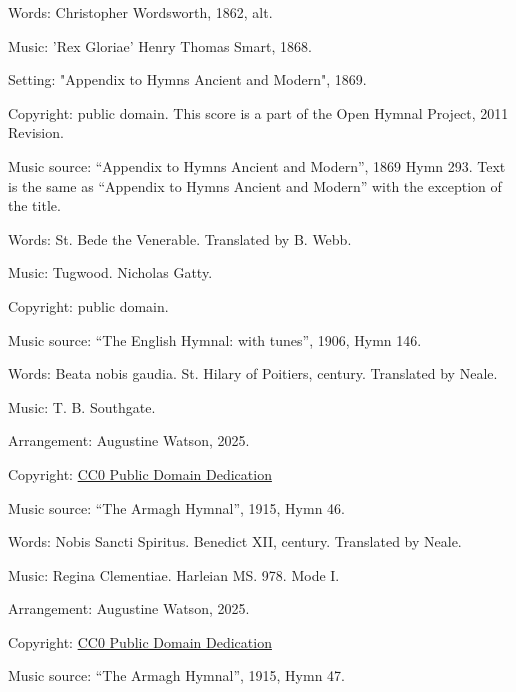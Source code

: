 \begin{multicols}{2}
\par\noindent
Words: Christopher Wordsworth, 1862, alt.
\par\noindent
Music: 'Rex Gloriae' Henry Thomas Smart, 1868. 
\par\noindent
Setting: "Appendix to Hymns Ancient and Modern", 1869.
\par\noindent
Copyright: public domain.  This score is a part of the Open Hymnal Project, 2011 Revision.
\par\noindent
Music source: ``Appendix to Hymns Ancient and Modern'', 1869 Hymn 293.  Text is the same as ``Appendix to Hymns Ancient and Modern'' with the exception of the title.

\par\noindent
Words: St. Bede the Venerable. Translated by B. Webb.
\par\noindent
Music: Tugwood. Nicholas Gatty.
\par\noindent
Copyright: public domain.
\par\noindent
Music source: ``The English Hymnal: with tunes'', 1906, Hymn 146.

\par\noindent
Words: Beata nobis gaudia. St. Hilary of Poitiers,  century. Translated by Neale.
\par\noindent
Music: T. B. Southgate.
\par\noindent
Arrangement: Augustine Watson, 2025.
\par\noindent
Copyright: \href{https://creativecommons.org/publicdomain/zero/1.0/}{CC0 Public Domain Dedication}
\par\noindent
Music source: ``The Armagh Hymnal'', 1915, Hymn 46.

\par\noindent
Words: Nobis Sancti Spiritus. Benedict XII,  century. Translated by Neale.
\par\noindent
Music: Regina Clementiae. Harleian MS. 978. Mode I.
\par\noindent
Arrangement: Augustine Watson, 2025.
\par\noindent
Copyright: \href{https://creativecommons.org/publicdomain/zero/1.0/}{CC0 Public Domain Dedication}
\par\noindent
Music source: ``The Armagh Hymnal'', 1915, Hymn 47.



\end{multicols}
